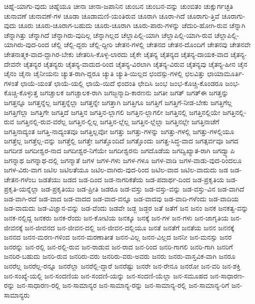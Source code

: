 {ಚಿಹ್ನೆ-ಯಾಗು-ವುದು
ಚಿಹ್ನೆಯೂ
ಚೀನಾ
ಚೀನಾ-ಜಪಾನಿನ
ಚುಂಬನ
ಚುಂಬನ-ವನ್ನು
ಚುಂಬಿತಂ
ಚುಕ್ಷುರ್ಗಚ್ಛತಿ
ಚುನಾವಣೆ
ಚುನಾವಣೆ-ಗಳ
ಚೂಡಾ
ಚೂಡಾಮಣಿ-ಯಂತಿರುವ
ಚೂರಾಗಿ
ಚೂರಾ-ಗಿದೆ
ಚೂರಾಗು-ತ್ತಿವೆ
ಚೂರಾಗು-ವುದು
ಚೂರು
ಚೂರು-ಚೂರಾಗ-ಬಹುದು
ಚೂರು-ಚೂರಾಗಿ
ಚೂರು-ಪಾರು-ಗಳನ್ನು
ಚೆದುರಿ-ಹೋಗಿ-ರುವ
ಚೆನ್ನಾಗಿ
ಚೆನ್ನಾಗಿತ್ತು
ಚೆನ್ನಾಗಿದೆ
ಚೆನ್ನಾಗಿರು-ವುದಿಲ್ಲ
ಚೆನ್ನಾಗಿಲ್ಲದ
ಚೆಲ್ಲಾಪಿಲ್ಲಿ-ಯಾಗಿ
ಚೆಲ್ಲಾಪಿಲ್ಲಿ-ಯಾಗಿ-ರುವ
ಚೆಲ್ಲಾಪಿಲ್ಲಿ-ಯಾಗಿರು-ವುದ-ರಿಂದ
ಚೆಲ್ಲಿ
ಚೆಲ್ಲಿ-ದ್ದರು
ಚೆಲ್ಲಿ-ದ್ದೀರಿ
ಚೇತನ-ಗಳಲ್ಲಿ
ಚೇತನದ
ಚೇತನ-ದೊಂದಿಗೆ
ಚೇತನವು
ಚೇತನವೇ
ಚೇತನಾತ್ಮಕ-ವಾದ-ದ್ದಾಗಿರ-ಬೇಕು
ಚೇತರಿಸಿ-ಕೊಳ್ಳ-ಲಾರದು
ಚೈಕೇ
ಚೈತನ್ಯ
ಚೈತನ್ಯದ
ಚೈತನ್ಯ-ದಾಯಕ-ವಾದ
ಚೈತನ್ಯ-ದೇವನೇ
ಚೈತನ್ಯರ
ಚೈತನ್ಯರು
ಚೈತನ್ಯ-ವಾದುದ-ರಿಂದ
ಚೈತನ್ಯ-ವಿರಲಾಗಿ
ಚೈತನ್ಯ-ವಿರುವ
ಚೈತನ್ಯವು
ಚೈತನ್ಯ-ಹೀನ
ಚೈನ
ಚೈನಂ
ಚೈನಾ
ಚೈನೀಯನು
ಚ್ಯುತ-ರಾಗಿ-ದ್ದರೂ
ಚ್ಯುತಿ
ಚ್ಯುತಿ-ಯಿಲ್ಲದ
ಛಂದಸ್ಸು-ಗಳಲ್ಲಿ
ಛಲವಿತ್ತು
ಛಾಯಾಮೂರ್ತಿ-ಗಳಂತೆ
ಛಾಯೆ-ಯಂತೆ
ಛಾಯೆ-ಯಲ್ಲಿ
ಛಾಯೆ-ಯಿದೆ
ಛಿಂದಂತಿ
ಛೇದಿಸಿ
ಜಂಭ
ಜಂಭ-ಕೊಚ್ಚಿ-ಕೊಂಡರೂ
ಜಂಭ-ಕೊಚ್ಚಿ-ಕೊಳ್ಳುತ್ತ
ಜಗಚ್ಚಾಲಕ
ಜಗಚ್ಚಾಲಕ-ರಾಗಿ
ಜಗಜ್ಜನ್ಮಾದಿ-ಕಾರಣನು
ಜಗತೀ
ಜಗತ್
ಜಗತ್ಈ
ಜಗತ್ತನ್ನು
ಜಗತ್ತನ್ನೂ
ಜಗತ್ತನ್ನೆಲ್ಲ
ಜಗತ್ತನ್ನೆಲ್ಲಾ
ಜಗತ್ತನ್ನೇ
ಜಗತ್ತಾಗಿ
ಜಗತ್ತಿಗೂ
ಜಗತ್ತಿಗೆ
ಜಗತ್ತಿಗೆ-ನೀಡ-ಬೇಕು
ಜಗತ್ತಿಗೆಲ್ಲ
ಜಗತ್ತಿಗೆಲ್ಲಾ
ಜಗತ್ತಿಗೇ
ಜಗತ್ತಿದೆ
ಜಗತ್ತಿನ
ಜಗತ್ತಿನ-ಲ್ಲಾಗಲಿ
ಜಗತ್ತಿನ-ಲ್ಲಾಗಲೀ
ಜಗತ್ತಿನಲ್ಲಿ
ಜಗತ್ತಿನಲ್ಲಿಯೇ
ಜಗತ್ತಿನಲ್ಲಿ-ರುವ
ಜಗತ್ತಿನಲ್ಲಿ-ರುವ-ವರೆಲ್ಲ
ಜಗತ್ತಿನ-ಲ್ಲಿಲ್ಲ
ಜಗತ್ತಿನ-ಲ್ಲೆಲ್ಲ
ಜಗತ್ತಿನ-ಲ್ಲೆಲ್ಲಾ
ಜಗತ್ತಿನಲ್ಲೇ
ಜಗತ್ತಿನಾಚೆಗೆ
ಜಗತ್ತಿನಾದ್ಯಂತ
ಜಗತ್ತಿ-ನಾದ್ಯಂತವೂ
ಜಗತ್ತಿಲ್ಲವೋ
ಜಗತ್ತು
ಜಗತ್ತು-ಗಳನ್ನು
ಜಗತ್ತು-ಗಳಲ್ಲಿ
ಜಗತ್ತು-ಗಳಲ್ಲಿಯೂ
ಜಗತ್ತೆಲ್ಲ
ಜಗತ್ತೆಲ್ಲ-ವನ್ನು
ಜಗತ್ತೆಲ್ಲಿ
ಜಗತ್ತೇ
ಜಗತ್ತೊಂದಿದೆ
ಜಗತ್ತೊಂದು
ಜಗತ್ಪ್ರ-ಸಿದ್ಧ-ವಾದ
ಜಗತ್ಸರ್ವವೂ
ಜಗದ
ಜಗದೀಶ
ಜಗದೀಶ್ವರ-ನಾದ
ಜಗದೀಶ್ವರ-ನಿಗೆಯೇ
ಜಗದೀಶ್ವರನು
ಜಗದೊಡೆಯ
ಜಗದ್ವಿಖ್ಯಾತ-ರಾಗಿ
ಜಗದ್ವ್ಯಾಪಿ
ಜಗನ್ನಾಥ
ಜಗನ್ನಾಥ-ದಲ್ಲಿ
ಜಗನ್ಮಾತೆ
ಜಗಳ
ಜಗಳ-ಗಳು
ಜಗಳ-ಗಳೂ
ಜಗಳ-ವಾಡಿ
ಜಗಳ-ವಾಡು-ವುದ-ರಿಂದಲೂ
ಜಗಳ-ವಿರು-ವಾಗ
ಜಟಿಲ
ಜಟಿಲತೆಯೂ
ಜಟಿಲ-ವಾಗಿರು-ವುದ-ರಿಂದ
ಜಟಿಲ-ವಾದ
ಜಟಿಲ-ವಾದುದು
ಜಡ
ಜಡ-ಚೇತನ-ಗಳೆಂಬ
ಜಡತೆಯು
ಜಡದ
ಜಡ-ದಿಂದ
ಜಡ-ನಾಗರಿಕತೆಯ
ಜಡ-ಪದಾರ್ಥ-ದಿಂದ
ಜಡ-ಪ್ರಕೃತಿಯ
ಜಡ-ಪ್ರಕೃತಿ-ಯನ್ನೆಲ್ಲಾ
ಜಡ-ಪ್ರಕೃತಿಯು
ಜಡ-ಪ್ರೀತಿ
ಜಡರೂ
ಜಡ-ವಸ್ತು
ಜಡ-ವಸ್ತು-ವನ್ನು
ಜಡ-ವಸ್ತು-ವಿನ
ಜಡ-ವಾಗಿದೆ
ಜಡ-ವಾಗಿ-ರದೆ
ಜಡ-ವಾದ
ಜಡ-ವಾದದ
ಜಡ-ವಾದ-ವನ್ನೂ
ಜಡ-ವಾದವು
ಜಡ-ವಾದಿ-ಗಳೆಂದು
ಜಡ-ವಾದಿಯ
ಜಡ-ವಾದುದು
ಜಡ-ವಿಜ್ಞಾನ-ವನ್ನು
ಜಡ-ವೆಂದು
ಜಡವೇ
ಜಡ್ಜ
ಜಡ್ಜರ
ಜತೆ
ಜತೆಗೆ
ಜನ
ಜನಂ
ಜನಕ
ಜನಕತ್ವ-ವನ್ನು
ಜನಕ-ನಲ್ಲಿದ್ದ
ಜನಕರು
ಜನಕ-ರೆಂದು
ಜನ-ಕೋಟಿಯ
ಜನಕ್ಕೂ
ಜನಕ್ಕೆ
ಜನ-ಗಳ
ಜನ-ಗಳು
ಜನ-ಜಾಗೃತಿಯ
ಜನ-ಜೀವನಕ್ಕೆ
ಜನ-ಜೀವನದ
ಜನ-ಜೀವನ-ದಲ್ಲಿ
ಜನ-ಜೀವನ-ದಲ್ಲಿಯೂ
ಜನತೆ
ಜನತೆಗೆ
ಜನತೆಯ
ಜನನ
ಜನನಕ್ಕೆ
ಜನನದ
ಜನನ-ಮರಣ-ಗಳಿಂದ
ಜನನ-ಮರಣಾತೀತ
ಜನನ-ವಿಲ್ಲ
ಜನನ-ವಿಲ್ಲದ
ಜನನೀ
ಜನ-ಮನಸ್ಸು
ಜನರ
ಜನರನ್ನು
ಜನ-ರಲ್ಲಿ
ಜನ-ರಲ್ಲಿ-ರುವ
ಜನ-ರಾಡುವ
ಜನ-ರಾದ
ಜನ-ರಿಂದ
ಜನರಿ-ಗಾಗಲಿ
ಜನರಿ-ಗಾಗಿ
ಜನರಿಗೆ
ಜನರಿರ-ಬಹುದು
ಜನರಿ-ರುವ
ಜನರಿರು-ವರು
ಜನರಿರು-ವರು-ಅವರು
ಜನರು
ಜನರು-ವಾಸ್ತವಿಕ-ವಾಗಿ
ಜನರೂ
ಜನರೆಲ್ಲ
ಜನರೆಲ್ಲ-ರನ್ನೂ
ಜನರೆಲ್ಲಾ
ಜನರೆಲ್ಲಿ-ದ್ದಾರೆ
ಜನರೆಷ್ಟು
ಜನರೇ
ಜನ-ರೇನೂ
ಜನರೋ
ಜನ-ವರಿ
ಜನ-ಶಕ್ತಿ
ಜನ-ಸಂಖ್ಯೆ-ಯಲ್ಲಿ
ಜನ-ಸಂದಣಿಯ
ಜನ-ಸಂದಣಿ-ಯನ್ನು
ಜನ-ಸಂದಣಿ-ಯೆಲ್ಲಾ
ಜನ-ಸಮೂಹದ
ಜನ-ಸಾಧಾರಣ-ರನ್ನು
ಜನ-ಸಾಧಾರಣ-ರಲ್ಲಿ
ಜನ-ಸಾಮಾನ್ಯರ
ಜನ-ಸಾಮಾನ್ಯ-ರನ್ನು
ಜನ-ಸಾಮಾನ್ಯ-ರಲ್ಲಿ
ಜನ-ಸಾಮಾನ್ಯ-ರಿಗೆ
ಜನ-ಸಾಮಾನ್ಯರು
}
